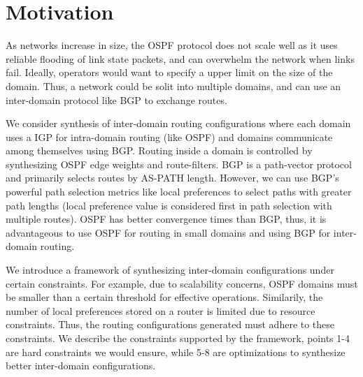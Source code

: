 \section{Motivation}
As networks increase in size, the OSPF protocol 
does not scale well as it uses reliable
flooding of link state packets, and can
overwhelm the network when links fail. 
Ideally, operators would want to specify
a upper limit on the size of the domain. Thus,
a network could be solit into multiple domains,
and can use an inter-domain protocol like
BGP to exchange routes. 

We consider synthesis of inter-domain routing 
configurations where each domain uses a 
IGP for intra-domain routing (like 
OSPF) and domains communicate among 
themselves using BGP. 
Routing inside a domain is controlled 
by synthesizing OSPF edge weights and 
route-filters. BGP is a path-vector
protocol and primarily selects routes by 
AS-PATH length. However, we can 
use BGP's powerful path selection metrics 
like local preferences to select 
paths with greater path lengths (local
preference value is considered first in 
path selection with multiple routes). 
OSPF has better convergence times than BGP,
thus, it is advantageous to use OSPF for 
routing in small domains and using BGP for
inter-domain routing. 

We introduce a framework of synthesizing
inter-domain configurations under certain
constraints. For example, due to scalability
concerns, OSPF domains must be smaller than 
a certain threshold for effective operations.
Similarily, the number of local preferences 
stored on a router is limited due to 
resource constraints. Thus, the routing 
configurations generated must adhere to 
these constraints. We describe the constraints
supported by the framework, points 1-4 are 
hard constraints we would ensure, while 5-8
are optimizations to synthesize better inter-domain
configurations. 

